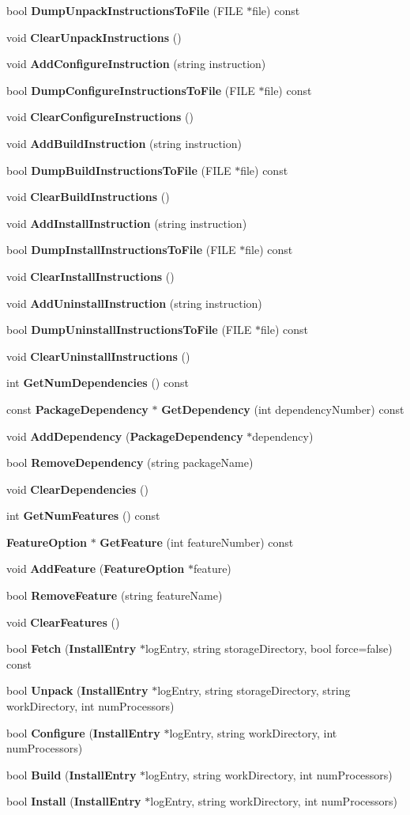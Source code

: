 \begin{DoxyCompactItemize}
\item 
bool {\bf DumpUnpackInstructionsToFile} (FILE $\ast$file) const 
\item 
void {\bf ClearUnpackInstructions} ()
\item 
void {\bf AddConfigureInstruction} (string instruction)
\item 
bool {\bf DumpConfigureInstructionsToFile} (FILE $\ast$file) const 
\item 
void {\bf ClearConfigureInstructions} ()
\item 
void {\bf AddBuildInstruction} (string instruction)
\item 
bool {\bf DumpBuildInstructionsToFile} (FILE $\ast$file) const 
\item 
void {\bf ClearBuildInstructions} ()
\item 
void {\bf AddInstallInstruction} (string instruction)
\item 
bool {\bf DumpInstallInstructionsToFile} (FILE $\ast$file) const 
\item 
void {\bf ClearInstallInstructions} ()
\item 
void {\bf AddUninstallInstruction} (string instruction)
\item 
bool {\bf DumpUninstallInstructionsToFile} (FILE $\ast$file) const 
\item 
void {\bf ClearUninstallInstructions} ()
\item 
int {\bf GetNumDependencies} () const 
\item 
const {\bf PackageDependency} $\ast$ {\bf GetDependency} (int dependencyNumber) const 
\item 
void {\bf AddDependency} ({\bf PackageDependency} $\ast$dependency)
\item 
bool {\bf RemoveDependency} (string packageName)
\item 
void {\bf ClearDependencies} ()
\item 
int {\bf GetNumFeatures} () const 
\item 
{\bf FeatureOption} $\ast$ {\bf GetFeature} (int featureNumber) const 
\item 
void {\bf AddFeature} ({\bf FeatureOption} $\ast$feature)
\item 
bool {\bf RemoveFeature} (string featureName)
\item 
void {\bf ClearFeatures} ()
\item 
bool {\bf Fetch} ({\bf InstallEntry} $\ast$logEntry, string storageDirectory, bool force=false) const 
\item 
bool {\bf Unpack} ({\bf InstallEntry} $\ast$logEntry, string storageDirectory, string workDirectory, int numProcessors)
\item 
bool {\bf Configure} ({\bf InstallEntry} $\ast$logEntry, string workDirectory, int numProcessors)
\item 
bool {\bf Build} ({\bf InstallEntry} $\ast$logEntry, string workDirectory, int numProcessors)
\item 
bool {\bf Install} ({\bf InstallEntry} $\ast$logEntry, string workDirectory, int numProcessors)
\end{DoxyCompactItemize}
